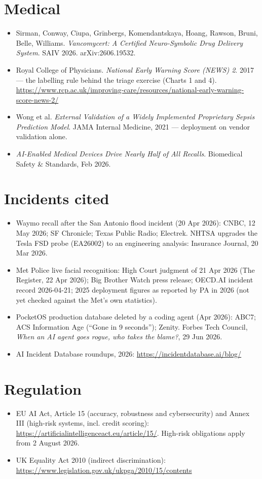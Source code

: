 \documentclass[11pt]{article}
\begin{document}
\section*{Medical}
\begin{itemize}
  \item Sirman, Conway, Ciupa, Grīnbergs, Komendantskaya, Hoang, Rawson, Bruni, Belle, Williams. \emph{Vancomycert: A Certified Neuro-Symbolic Drug Delivery System}. SAIV 2026. arXiv:2606.19532.
  \item Royal College of Physicians. \emph{National Early Warning Score (NEWS) 2}. 2017 — the labelling rule behind the triage exercise (Charts 1 and 4). \url{https://www.rcp.ac.uk/improving-care/resources/national-early-warning-score-news-2/}
  \item Wong et al. \emph{External Validation of a Widely Implemented Proprietary Sepsis Prediction Model}. JAMA Internal Medicine, 2021 — deployment on vendor validation alone.
  \item \emph{AI-Enabled Medical Devices Drive Nearly Half of All Recalls}. Biomedical Safety \& Standards, Feb 2026.
\end{itemize}
\section*{Incidents cited}
\begin{itemize}
  \item Waymo recall after the San Antonio flood incident (20 Apr 2026): CNBC, 12 May 2026; SF Chronicle; Texas Public Radio; Electrek. NHTSA upgrades the Tesla FSD probe (EA26002) to an engineering analysis: Insurance Journal, 20 Mar 2026.
  \item Met Police live facial recognition: High Court judgment of 21 Apr 2026 (The Register, 22 Apr 2026); Big Brother Watch press release; OECD.AI incident record 2026-04-21; 2025 deployment figures as reported by PA in 2026 (not yet checked against the Met's own statistics).
  \item PocketOS production database deleted by a coding agent (Apr 2026): ABC7; ACS Information Age (``Gone in 9 seconds''); Zenity. Forbes Tech Council, \emph{When an AI agent goes rogue, who takes the blame?}, 29 Jun 2026.
  \item AI Incident Database roundups, 2026: \url{https://incidentdatabase.ai/blog/}
\end{itemize}
\section*{Regulation}
\begin{itemize}
  \item EU AI Act, Article 15 (accuracy, robustness and cybersecurity) and Annex III (high-risk systems, incl. credit scoring): \url{https://artificialintelligenceact.eu/article/15/}. High-risk obligations apply from 2 August 2026.
  \item UK Equality Act 2010 (indirect discrimination): \url{https://www.legislation.gov.uk/ukpga/2010/15/contents}
\end{itemize}
\end{document}
